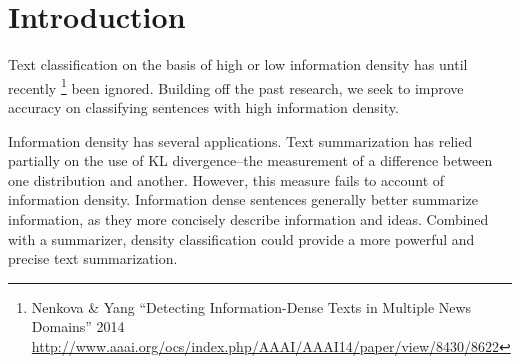 \documentclass[
10pt, %
a4paper, %
oneside, %
headinclude,footinclude, %
BCOR5mm, %
]{scrartcl}
\title{\normalfont\spacedallcaps{CIS530 Final Report}}
\author{\spacedlowsmallcaps{Stuart Wagner \& Michael Woods}}
\date{}
\begin{document}

\renewcommand{\sectionmark}[1]{\markright{\spacedlowsmallcaps{#1}}}

\lehead{\mbox{\llap{\small\thepage\kern1em\color{halfgray} \vline}\color{halfgray}\hspace{0.5em}\rightmark\hfil}}

\pagestyle{scrheadings}


\maketitle

\setcounter{tocdepth}{2}



\section{Introduction}

Text classification on the basis of high or low information density has until
recently
\footnote{Nenkova \& Yang ``Detecting Information-Dense Texts in Multiple News Domains'' 2014 \newline 
\url{http://www.aaai.org/ocs/index.php/AAAI/AAAI14/paper/view/8430/8622}} 
been ignored. Building off the past research, we seek to improve accuracy on
classifying sentences with high information density.

Information density has several applications. Text summarization has relied
partially on the use of KL divergence--the measurement of a difference between
one distribution and another. However, this measure fails to account of
information density. Information dense sentences generally better summarize
information, as they more concisely describe information and ideas. Combined
with a summarizer, density classification could provide a more powerful and
precise text summarization.
\end{document}
